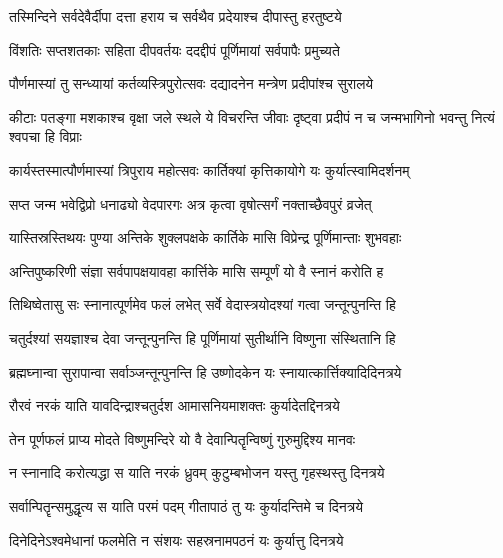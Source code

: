 \twolineshloka
{तस्मिन्दिने सर्वदेवैर्दीपा दत्ता हराय च}
{सर्वथैव प्रदेयाश्च दीपास्तु हरतुष्टये} %

\twolineshloka
{विंशतिः सप्तशतकाः सहिता दीपवर्तयः}
{ददद्दीपं पूर्णिमायां सर्वपापैः प्रमुच्यते} %

\twolineshloka
{पौर्णमास्यां तु सन्ध्यायां कर्तव्यस्त्रिपुरोत्सवः}
{दद्यादनेन मन्त्रेण प्रदीपांश्च सुरालये} %

\twolineshloka
{कीटाः पतङ्गा मशकाश्च वृक्षा जले स्थले ये विचरन्ति जीवाः}
{दृष्ट्वा प्रदीपं न च जन्मभागिनो भवन्तु नित्यं श्वपचा हि विप्राः} %

\twolineshloka
{कार्यस्तस्मात्पौर्णमास्यां त्रिपुराय महोत्सवः}
{कार्तिक्यां कृत्तिकायोगे यः कुर्यात्स्वामिदर्शनम्} %

\twolineshloka
{सप्त जन्म भवेद्विप्रो धनाढ्यो वेदपारगः}
{अत्र कृत्वा वृषोत्सर्गं नक्ताच्छैवपुरं व्रजेत्} %





\twolineshloka
{यास्तिस्रस्तिथयः पुण्या अन्तिके शुक्लपक्षके}
{कार्तिके मासि विप्रेन्द्र पूर्णिमान्ताः शुभवहाः} %

\twolineshloka
{अन्तिपुष्करिणी संज्ञा सर्वपापक्षयावहा}
{कार्त्तिके मासि सम्पूर्णं यो वै स्नानं करोति ह} %

\twolineshloka
{तिथिष्वेतासु सः स्नानात्पूर्णमेव फलं लभेत्}
{सर्वे वेदास्त्रयोदश्यां गत्वा जन्तून्पुनन्ति हि} %

\twolineshloka
{चतुर्दश्यां सयज्ञाश्च देवा जन्तून्पुनन्ति हि}
{पूर्णिमायां सुतीर्थानि विष्णुना संस्थितानि हि} %

\twolineshloka
{ब्रह्मघ्नान्वा सुरापान्वा सर्वाञ्जन्तून्पुनन्ति हि}
{उष्णोदकेन यः स्नायात्कार्त्तिक्यादिदिनत्रये} %

\twolineshloka
{रौरवं नरकं याति यावदिन्द्राश्चतुर्दश}
{आमासनियमाशक्तः कुर्यादेतद्दिनत्रये} %

\twolineshloka
{तेन पूर्णफलं प्राप्य मोदते विष्णुमन्दिरे}
{यो वै देवान्पितॄन्विष्णुं गुरुमुद्दिश्य मानवः} %

\twolineshloka
{न स्नानादि करोत्यद्धा स याति नरकं ध्रुवम्}
{कुटुम्बभोजन यस्तु गृहस्थस्तु दिनत्रये} %

\twolineshloka
{सर्वान्पितॄन्समुद्धृत्य स याति परमं पदम्}
{गीतापाठं तु यः कुर्यादन्तिमे च दिनत्रये} %

\twolineshloka
{दिनेदिनेऽश्वमेधानां फलमेति न संशयः}
{सहस्रनामपठनं यः कुर्यात्तु दिनत्रये} %

